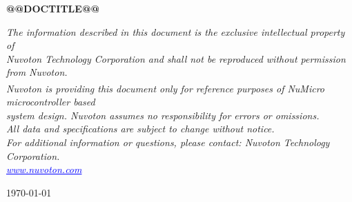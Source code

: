 \begin{titlepage}

\vspace{6cm}

\begin{center}
    {\huge \textbf{@@DOCTITLE@@}}
\end{center}

\vfill

\begin{center}
    \footnotesize \itshape
    The information described in this document is the exclusive intellectual property of \\
    Nuvoton Technology Corporation and shall not be reproduced without permission from Nuvoton. \\[0.5cm]

    Nuvoton is providing this document only for reference purposes of NuMicro\textsuperscript{\tiny\textregistered} microcontroller based \\
    system design. Nuvoton assumes no responsibility for errors or omissions. \\[0.5cm]

    All data and specifications are subject to change without notice. \\[0.8cm]

    For additional information or questions, please contact: Nuvoton Technology Corporation. \\[0.3cm]

    \textcolor{blue}{\underline{www.nuvoton.com}}
\end{center}

\vspace{2cm}

\noindent
\begin{minipage}[b]{0.33\textwidth}
    \small \today
\end{minipage}%


\end{titlepage}